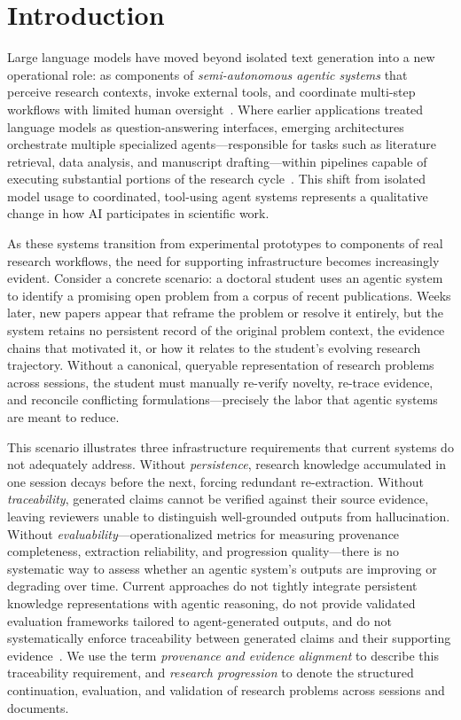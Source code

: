 \section{Introduction}
\label{sec:introduction}

Large language models have moved beyond isolated text generation into a new operational role: as components of \emph{semi-autonomous agentic systems} that perceive research contexts, invoke external tools, and coordinate multi-step workflows with limited human oversight~\cite{villaescusa2025denario, trinkenreich2025train}. Where earlier applications treated language models as question-answering interfaces, emerging architectures orchestrate multiple specialized agents—responsible for tasks such as literature retrieval, data analysis, and manuscript drafting—within pipelines capable of executing substantial portions of the research cycle~\cite{villaescusa2025denario}. This shift from isolated model usage to coordinated, tool-using agent systems represents a qualitative change in how AI participates in scientific work.

As these systems transition from experimental prototypes to components of real research workflows, the need for supporting infrastructure becomes increasingly evident. Consider a concrete scenario: a doctoral student uses an agentic system to identify a promising open problem from a corpus of recent publications. Weeks later, new papers appear that reframe the problem or resolve it entirely, but the system retains no persistent record of the original problem context, the evidence chains that motivated it, or how it relates to the student's evolving research trajectory. Without a canonical, queryable representation of research problems across sessions, the student must manually re-verify novelty, re-trace evidence, and reconcile conflicting formulations---precisely the labor that agentic systems are meant to reduce.

This scenario illustrates three infrastructure requirements that current systems do not adequately address. Without \emph{persistence}, research knowledge accumulated in one session decays before the next, forcing redundant re-extraction. Without \emph{traceability}, generated claims cannot be verified against their source evidence, leaving reviewers unable to distinguish well-grounded outputs from hallucination. Without \emph{evaluability}---operationalized metrics for measuring provenance completeness, extraction reliability, and progression quality---there is no systematic way to assess whether an agentic system's outputs are improving or degrading over time. Current approaches do not tightly integrate persistent knowledge representations with agentic reasoning, do not provide validated evaluation frameworks tailored to agent-generated outputs, and do not systematically enforce traceability between generated claims and their supporting evidence~\cite{suryawanshi2025kgrag, ralph2021empirical, baltes2025guidelines, sharkey2025mechanistic}. We use the term \emph{provenance and evidence alignment} to describe this traceability requirement, and \emph{research progression} to denote the structured continuation, evaluation, and validation of research problems across sessions and documents.

